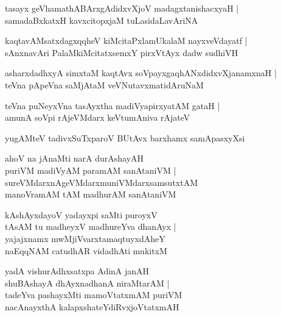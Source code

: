 \documentclass[twoside,12pt,openright]{book}
\newcounter{shloka}[chapter]
\begin{document}
\begin{shloka}%
tasayx geVhamathABArxgAdidxvXjoV madagxtanishacxyaH |\\
samadaBxkatxH kavxcitopxjaM tuLasidaLavAriNA 
\end{shloka}

\begin{shloka}%
kaqtavAMsatxdagxqqheV kiMcitaPxlamUkalaM nayxveVdayatf |\\
sAnxnavAri PalaMkiMcitatxsemxY pirxVtAyx dadw sudhiVH 
\end{shloka}

\begin{shloka}%
asharxdadhxyA simxtaM kaqtAvx soVpayxgaqhANxdidxvXjanamxnaH |\\
teVna pApeVna saMjAtaM veVNutavxmatidAruNaM 
\end{shloka}

\begin{shloka}%
teVna puNeyxVna tasAyxtha madiVyapirxyatAM gataH |\\
amunA soVpi rAjeVMdarx keVtumAniva rAjateV 
\end{shloka}

\begin{shloka}%
yugAMteV tadivxSuTxparoV BUtAvx barxhamx samApasxyXsi 
\end{shloka}

\begin{shloka}%
ahoV na jAnaMti narA durAshayAH \\
puriVM madiVyAM paramAM sanAtaniVM |\\
sureVMdarxnAgeVMdarxmuniVMdarxsamsutxtAM \\
manoVramAM tAM madhurAM sanAtaniVM 
\end{shloka}

\begin{shloka}%
kAshAyxdayoV yadayxpi saMti puroyxV \\
tAsAM tu madheyxV madhureYva dhanAyx |\\
yajajxnamx mwMjiVvarxtamaqtuyxdAheY \\
naEqqNAM catudhAR vidadhAti mukitxM 
\end{shloka}

\begin{shloka}%
yadA vishurAdhxsatxpa AdinA janAH \\
shuBAshayA dhAyxnadhanA niraMtarAM |\\
tadeYva pashayxMti mamoVtatxmAM puriVM \\
nacAnayxthA kalapxshateYdiRvxjoVtatxmAH
\end{shloka}
\end{document}
